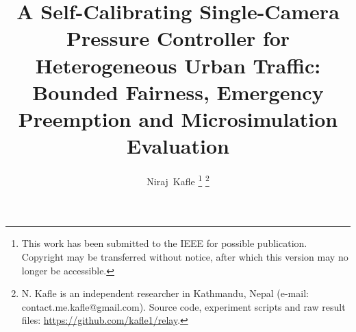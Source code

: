 \documentclass[journal]{IEEEtran}
\begin{document}
\title{A Self-Calibrating Single-Camera Pressure Controller for Heterogeneous Urban Traffic:
Bounded Fairness, Emergency Preemption and Microsimulation Evaluation}

\author{Niraj~Kafle%
\thanks{This work has been submitted to the IEEE for possible publication. Copyright may be transferred without notice, after which this version may no longer be accessible.}%
\thanks{N. Kafle is an independent researcher in Kathmandu, Nepal (e-mail: contact.me.kafle@gmail.com).
Source code, experiment scripts and raw result files: \url{https://github.com/kafle1/relay}.}}


\maketitle
\end{document}
